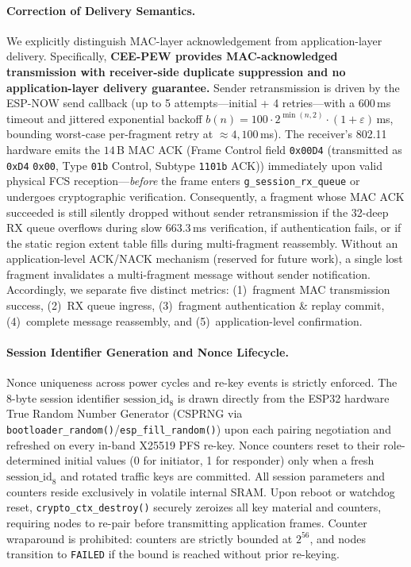 \documentclass[conference]{IEEEtran}
\begin{document}
\paragraph{Correction of Delivery Semantics.} We explicitly distinguish MAC-layer acknowledgement from application-layer delivery. Specifically, \textbf{CEE-PEW provides MAC-acknowledged transmission with receiver-side duplicate suppression and no application-layer delivery guarantee.} Sender retransmission is driven by the ESP-NOW send callback (up to 5 attempts---initial + 4 retries---with a $600$\,ms timeout and jittered exponential backoff $b(n) = 100\cdot 2^{\min(n,2)}\cdot(1+\varepsilon)$\,ms, bounding worst-case per-fragment retry at $\approx 4{,}100$\,ms). The receiver's 802.11 hardware emits the $14$\,B MAC ACK (Frame Control field \texttt{0x00D4} (transmitted as \texttt{0xD4} \texttt{0x00}, Type \texttt{01b} Control, Subtype \texttt{1101b} ACK)) immediately upon valid physical FCS reception---\emph{before} the frame enters \texttt{g\_session\_rx\_queue} or undergoes cryptographic verification. Consequently, a fragment whose MAC ACK succeeded is still silently dropped without sender retransmission if the 32-deep RX queue overflows during slow $663.3$\,ms verification, if authentication fails, or if the static region extent table fills during multi-fragment reassembly. Without an application-level ACK/NACK mechanism (reserved for future work), a single lost fragment invalidates a multi-fragment message without sender notification. Accordingly, we separate five distinct metrics: (1)~fragment MAC transmission success, (2)~RX queue ingress, (3)~fragment authentication \& replay commit, (4)~complete message reassembly, and (5)~application-level confirmation.

\paragraph{Session Identifier Generation and Nonce Lifecycle.} Nonce uniqueness across power cycles and re-key events is strictly enforced. The 8-byte session identifier $\text{session\_id}_8$ is drawn directly from the ESP32 hardware True Random Number Generator (CSPRNG via \texttt{bootloader\_random()}/\texttt{esp\_fill\_random()}) upon each pairing negotiation and refreshed on every in-band X25519 PFS re-key. Nonce counters reset to their role-determined initial values (0 for initiator, 1 for responder) only when a fresh $\text{session\_id}_8$ and rotated traffic keys are committed. All session parameters and counters reside exclusively in volatile internal SRAM. Upon reboot or watchdog reset, \texttt{crypto\_ctx\_destroy()} securely zeroizes all key material and counters, requiring nodes to re-pair before transmitting application frames. Counter wraparound is prohibited: counters are strictly bounded at $2^{56}$, and nodes transition to \texttt{FAILED} if the bound is reached without prior re-keying.
\end{document}
